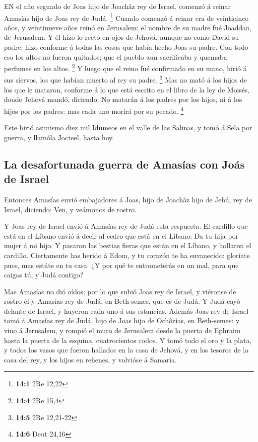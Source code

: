  EN el año segundo de Joas hijo de Joachâz rey de Israel,
comenzó á reinar Amasías hijo de Joas rey de Judá. \footnote{\textbf{14:1}
  2Re 12,22}  Cuando comenzó á reinar era de veinticinco
años, y veintinueve años reinó en Jerusalem: el nombre de su madre fué
Joaddan, de Jerusalem.  Y él hizo lo recto en ojos de
Jehová, aunque no como David su padre: hizo conforme á todas las cosas
que había hecho Joas su padre.  Con todo eso los altos no
fueron quitados; que el pueblo aun sacrificaba y quemaba perfumes en los
altos. \footnote{\textbf{14:4} 2Re 15,4}  Y luego que el
reino fué confirmado en su mano, hirió á sus siervos, los que habían
muerto al rey su padre. \footnote{\textbf{14:5} 2Re 12,21-22}
 Mas no mató á los hijos de los que le mataron, conforme á
lo que está escrito en el libro de la ley de Moisés, donde Jehová mandó,
diciendo: No matarán á los padres por los hijos, ni á los hijos por los
padres: mas cada uno morirá por su pecado. \footnote{\textbf{14:6} Deut
  24,16}

 Este hirió asimismo diez mil Idumeos en el valle de las
Salinas, y tomó á Sela por guerra, y llamóla Jocteel, hasta hoy.

\hypertarget{la-desafortunada-guerra-de-amasuxedas-con-jouxe1s-de-israel}{%
\subsection{La desafortunada guerra de Amasías con Joás de
Israel}\label{la-desafortunada-guerra-de-amasuxedas-con-jouxe1s-de-israel}}

 Entonces Amasías envió embajadores á Joas, hijo de Joachâz
hijo de Jehú, rey de Israel, diciendo: Ven, y veámonos de rostro.

 Y Joas rey de Israel envió á Amasías rey de Judá esta
respuesta: El cardillo que está en el Líbano envió á decir al cedro que
está en el Líbano: Da tu hija por mujer á mi hijo. Y pasaron las bestias
fieras que están en el Líbano, y hollaron el cardillo. 
Ciertamente has herido á Edom, y tu corazón te ha envanecido: gloríate
pues, mas estáte en tu casa. ¿Y por qué te entrometerás en un mal, para
que caigas tú, y Judá contigo?

 Mas Amasías no dió oídos; por lo que subió Joas rey de
Israel, y viéronse de rostro él y Amasías rey de Judá, en Beth-semes,
que es de Judá.  Y Judá cayó delante de Israel, y huyeron
cada uno á sus estancias.  Además Joas rey de Israel tomó á
Amasías rey de Judá, hijo de Joas hijo de Ochôzías, en Beth-semes: y
vino á Jerusalem, y rompió el muro de Jerusalem desde la puerta de
Ephraim hasta la puerta de la esquina, cuatrocientos codos.
 Y tomó todo el oro y la plata, y todos los vasos que
fueron hallados en la casa de Jehová, y en los tesoros de la casa del
rey, y los hijos en rehenes, y volvióse á Samaria.

